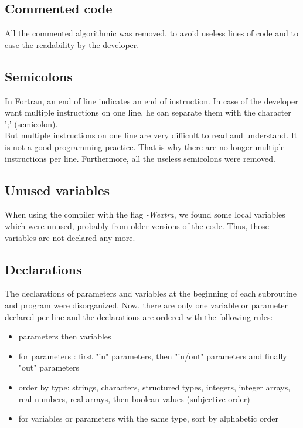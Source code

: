 \subsection{Commented code}
All the commented algorithmic was removed, to avoid useless lines of code and to ease the readability by the developer.

\subsection{Semicolons}
In Fortran, an end of line indicates an end of instruction. In case of the developer want multiple instructions on one line, he can separate them with the character ';' (semicolon).
\\But multiple instructions on one line are very difficult to read and understand. It is not a good programming practice. That is why there are no longer multiple instructions per line. Furthermore, all the useless semicolons were removed.

\subsection{Unused variables}
When using the compiler with the flag \textit{-Wextra}, we found some local variables which were unused, probably from older versions of the code. Thus, those variables are not declared any more. 

\subsection{Declarations}
The declarations of parameters and variables at the beginning of each subroutine and program were disorganized. Now, there are only one variable or parameter declared per line and the declarations are ordered with the following rules: 
\begin{itemize}
\item 
parameters then variables
\item
for parameters : first "in" parameters, then "in/out" parameters and finally "out" parameters
\item
order by type: strings, characters, structured types, integers, integer arrays, real numbers, real arrays, then boolean values (subjective order)
\item
for variables or parameters with the same type, sort by alphabetic order
\end{itemize}


